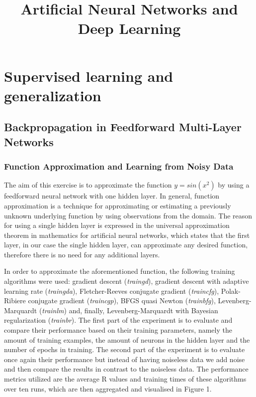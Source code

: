 \documentclass[11pt,conference,compsoc]{IEEEtran}
\begin{document}
\title{Artificial Neural Networks and Deep Learning}

\author{
}
\maketitle

\thispagestyle{plain}
\pagestyle{plain}


\section{Supervised learning and generalization}

\subsection{Backpropagation in Feedforward Multi-Layer Networks}

\subsubsection{Function Approximation and Learning from Noisy Data\\}

The aim of this exercise is to approximate the function $y=sin(x^2)$ by using a feedforward neural network with one hidden layer. In general, function approximation is a technique for approximating or estimating a previously unknown underlying function by using observations from the domain. The reason for using a single hidden layer is expressed in the universal approximation theorem in mathematics for artificial neural networks, which states that the first layer, in our case the single hidden layer, can approximate any desired function, therefore there is no need for any additional layers. 

In order to approximate the aforementioned function, the following training algorithms were used: gradient descent (\textit{traingd}), gradient descent with adaptive learning rate (\textit{traingda}), Fletcher-Reeves conjugate gradient (\textit{traincfg}), Polak-Ribiere conjugate gradient (\textit{traincgp}), BFGS quasi Newton (\textit{trainbfg}), Levenberg-Marquardt (\textit{trainlm}) and, finally, Levenberg-Marquardt with Bayesian regularization (\textit{trainbr}). The first part of the experiment is to evaluate and compare their performance based on their training parameters, namely the amount of training examples, the amount of neurons in the hidden layer and the number of epochs in training. The second part of the experiment is to evaluate once again their performance but instead of having noiseless data we add noise and then compare the results in contrast to the noiseless data. The performance metrics utilized are the average R values and training times of these algorithms over ten runs, which are then aggregated and visualised in Figure 1.
\end{document}
